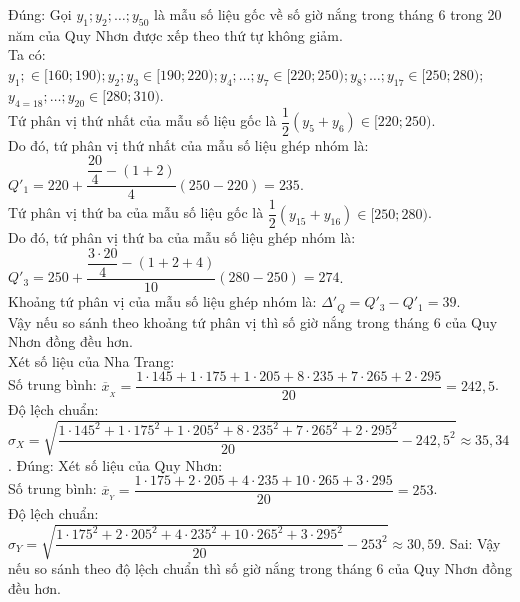 \begin{ex}
{\begin{itemchoice}
			\itemch Đúng: Gọi $y_1; y_2;\ldots; y_{50}$ là mẫu số liệu  gốc về số giờ nắng trong tháng 6 trong 20 năm của Quy Nhơn được xếp theo thứ tự không giảm.\\
			 Ta có:\\
			$y_1;\in [160;190); y_2;y_3\in [190;220); y_4;\ldots; y_7\in [220;250);  y_8;\ldots; y_{17}\in [250;280);$\\
			 $y_{4=18};\ldots; y_{20}\in [280;310)$.\\
			Tứ  phân vị thứ nhất của mẫu số liệu gốc là $\dfrac{1}{2}(y_5+y_6)\in [220;250)$. \\
			Do đó, tứ phân vị  thứ nhất của mẫu số liệu ghép nhóm là: \\
			$Q'_1=220+\dfrac{\dfrac{20}{4}-(1+2)}{4}(250-220)=235$.\\ 
			Tứ phân vị thứ  ba của mẫu số liệu gốc là $\dfrac{1}{2}(y_{15}+y_{16})\in [250;280)$. \\
			Do đó, tứ phân  vị thứ ba của mẫu số liệu ghép nhóm là: \\
			$Q'_3=250+\dfrac{\dfrac{3\cdot  20}{4}-(1+2+4)}{10}(280-250) =274$.\\
			Khoảng tứ phân vị của mẫu số  liệu ghép nhóm là: $\Delta'_Q=Q'_3-Q'_1=39$.\\
			Vậy nếu so sánh theo  khoảng tứ phân vị thì số giờ nắng trong tháng 6 của Quy Nhơn đồng đều hơn.\\
			Xét số liệu của Nha Trang:\\ 
			 Số trung bình: $\overline{x}_{_X}=\dfrac{1\cdot 145+1\cdot 175+1\cdot 205+8\cdot 235+7\cdot 265+2\cdot 295}{20}=242{,}5$.\\
			Độ lệch  chuẩn: $\sigma_X=\sqrt{\dfrac{1\cdot 145^2+1\cdot 175^2+1\cdot 205^2+8\cdot 235^2+7\cdot 265^2+2\cdot 295^2}{20}-242{,}5^2} \approx 35{,}34$.
			 \itemch Đúng: Xét số liệu của Quy Nhơn:\\
			Số trung bình: $\overline{x}_{_Y}=\dfrac{1\cdot 175+2\cdot  205+4\cdot 235+10\cdot 265+3\cdot 295}{20}=253$.\\
			Độ lệch chuẩn: $\sigma_Y=\sqrt{\dfrac{1\cdot 175^2+2\cdot 205^2+4\cdot 235^2+10\cdot 265^2+3\cdot 295^2}{20}-253^2} \approx  30{,}59$.
			\itemch Sai: Vậy nếu so sánh theo độ lệch chuẩn thì số giờ nắng trong  tháng 6 của Quy Nhơn đồng đều hơn.
		\end{itemchoice}
	} 
\end{ex}

